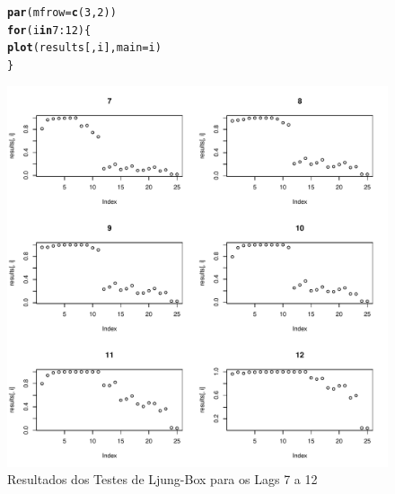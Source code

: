 \documentclass{article}\usepackage[]{graphicx}\usepackage[]{color}
\makeatletter
\def\maxwidth{ %
  \ifdim\Gin@nat@width>\linewidth
    \linewidth
  \else
    \Gin@nat@width
  \fi
}
\newcommand{\hlnum}[1]{\textcolor[rgb]{0.686,0.059,0.569}{#1}}%
\newcommand{\hlopt}[1]{\textcolor[rgb]{0,0,0}{#1}}%
\newcommand{\hlstd}[1]{\textcolor[rgb]{0.345,0.345,0.345}{#1}}%
\newcommand{\hlkwa}[1]{\textcolor[rgb]{0.161,0.373,0.58}{\textbf{#1}}}%
\newcommand{\hlkwc}[1]{\textcolor[rgb]{0.333,0.667,0.333}{#1}}%
\newcommand{\hlkwd}[1]{\textcolor[rgb]{0.737,0.353,0.396}{\textbf{#1}}}%
\newenvironment{kframe}{%
 \def\at@end@of@kframe{}%
 \ifinner\ifhmode%
  \def\at@end@of@kframe{\end{minipage}}%
  \begin{minipage}{\columnwidth}%
 \fi\fi%
 \def\FrameCommand##1{\hskip\@totalleftmargin \hskip-\fboxsep
 \colorbox{shadecolor}{##1}\hskip-\fboxsep
     \hskip-\linewidth \hskip-\@totalleftmargin \hskip\columnwidth}%
 \MakeFramed {\advance\hsize-\width
   \@totalleftmargin\z@ \linewidth\hsize
   \@setminipage}}%
 {\par\unskip\endMakeFramed%
 \at@end@of@kframe}
\newenvironment{knitrout}{}{} %
\makeatother
\begin{document}
            \begin{figure}[H]
            \caption{Resultados dos Testes de Ljung-Box para os Lags 7 a 12}
            \centering
\begin{knitrout}
\color{fgcolor}\begin{kframe}
\begin{alltt}
\hlkwd{par}\hlstd{(}\hlkwc{mfrow} \hlstd{=} \hlkwd{c}\hlstd{(}\hlnum{3}\hlstd{,}\hlnum{2}\hlstd{))}
\hlkwa{for} \hlstd{(i} \hlkwa{in} \hlnum{7}\hlopt{:}\hlnum{12}\hlstd{)\{}
  \hlkwd{plot}\hlstd{(results[,i],} \hlkwc{main}\hlstd{=i)}
\hlstd{\}}
\end{alltt}
\end{kframe}
\includegraphics[width=\maxwidth]{figure/unnamed-chunk-80-1} 

\end{knitrout}
            \end{figure}
            
\end{document}

